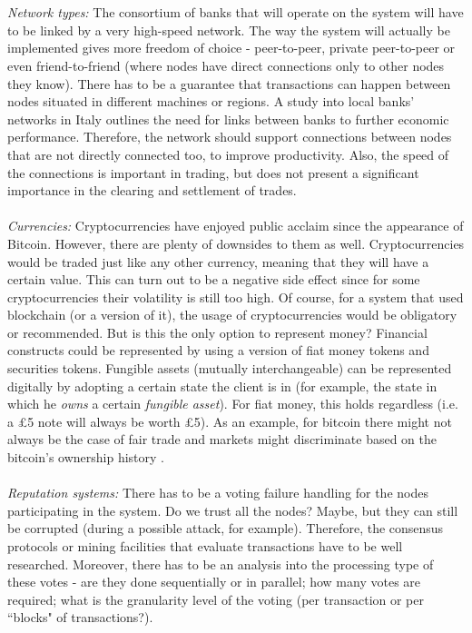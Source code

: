 \documentclass[12pt,twoside]{article}
\begin{document}
\\ \\
\textit{Network types:} The consortium of banks that will operate on the system will have to be linked by a very high-speed network. The way the system will actually be implemented gives more freedom of choice - peer-to-peer, private peer-to-peer or even friend-to-friend (where nodes have direct connections only to other nodes they know). There has to be a guarantee that transactions can happen between nodes situated in different machines or regions. A study into local banks' networks in Italy \cite{Italy:networks} outlines the need for links between banks to further economic performance. Therefore, the network should support connections between nodes that are not directly connected too, to improve productivity. Also, the speed of the connections is important in trading, but does not present a significant importance in the clearing and settlement of trades. 
\\ \\
\textit{Currencies:} Cryptocurrencies have enjoyed public acclaim since the appearance of Bitcoin. However, there are plenty of downsides to them as well. Cryptocurrencies would be traded just like any other currency, meaning that they will have a certain value. This can turn out to be a negative side effect since for some cryptocurrencies their volatility is still too high. Of course, for a system that used blockchain (or a version of it), the usage of cryptocurrencies would be obligatory or recommended. But is this the only option to represent money? Financial constructs could be represented by using a version of fiat money tokens and securities tokens. Fungible assets (mutually interchangeable) can be represented digitally by adopting a certain state the client is in (for example, the state in which he \textit{owns} a certain \textit{fungible asset}). For fiat money, this holds regardless (i.e. a \pounds 5 note will always be worth \pounds 5). As an example, for bitcoin there might not always be the case of fair trade and markets might discriminate based on the bitcoin's ownership history \cite{BC:Fungibility}.
\\ \\
\textit{Reputation systems:} There has to be a voting failure handling for the nodes participating in the system. Do we trust all the nodes? Maybe, but they can still be corrupted (during a possible attack, for example). Therefore, the consensus protocols or mining facilities that evaluate transactions have to be well researched. Moreover, there has to be an analysis into the processing type of these votes - are they done sequentially or in parallel; how many votes are required; what is the granularity level of the voting (per transaction or per ``blocks" of transactions?).
\end{document}
